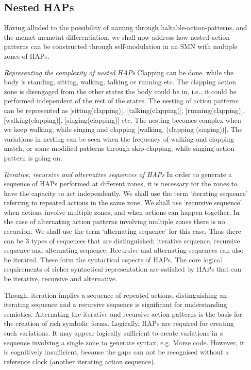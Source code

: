 \subsection{Nested HAPs}

Having alluded to the possibility of naming through haltable-action-patterns, and the memet-memetat differentiation, we shall now address how nested-action-patterns can be constructed through self-modulation in an SMN with multiple zones of HAPs.

\emph{Representing the complexity of nested HAPs} Clapping can be done, while the body is standing, sitting, walking, talking or running etc. The clapping action zone is disengaged from the other states the body could be in, i.e., it could be performed independent of the rest of the states. The nesting of action patterns can be represented as [sitting(clapping)],  [talking(clapping)],  [running(clapping)],  [walking(clapping)],  [singing(clapping)] etc. The nesting becomes complex when we keep walking, while singing and clapping [walking, (clapping (singing))]. The variations in nesting can be seen when the frequency of walking and clapping match, or some modified patterns through skip-clapping, while singing action pattern is going on.

\emph{Iterative, recursive and alternative sequences of HAPs} In order to generate a sequence of HAPs performed at different zones, it is necessary for the zones to have the capacity to act independently. We shall use the term `iterating sequence' referring to repeated actions in the same zone. We shall use `recursive sequence' when actions involve multiple zones, and when actions can happen together. In the case of alternating action patterns involving multiple zones there is no recursion. We shall use the term `alternating sequence' for this case. Thus there can be 3 types of sequences that are distinguished:  iterative sequence, recursive sequence and alternating sequence. Recursive and alternating sequences can also be iterated. These form the syntactical aspects of HAPs. The core logical requirements of richer syntactical representation are satisfied by HAPs that can be iterative, recursive and alternative.

Though, iteration implies a sequence of repeated actions, distinguishing an iterating sequence and a recursive sequence is significant for understanding semiotics. Alternating the iterative and recursive action patterns is the basis for the creation of rich symbolic forms. Logically, HAPs are required for creating such variations. It may appear logically sufficient to create variations in a sequence involving a single zone to generate syntax, e.g. Morse code.  However, it is cognitively insufficient, because the gaps can not be recognised without a reference clock (another iterating action sequence).

